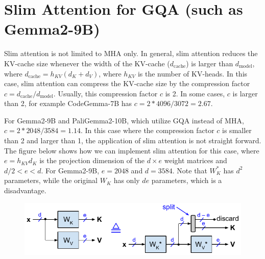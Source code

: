 \documentclass{article}
\begin{document}
\section{Slim Attention for GQA (such as Gemma2-9B)}
Slim attention is not limited to MHA only. In general, slim attention reduces the KV-cache size whenever the width of the KV-cache ($d_\text{cache}$) is larger than $d_\text{model}$, where $d_\text{cache} = h_{KV} (d_K + d_V)$, where $h_{KV}$ is the number of KV-heads. In this case, slim attention can compress the KV-cache size by the compression factor $c = d_\text{cache} / d_\text{model}$. Usually, this compression factor $c$ is 2. In some cases, $c$ is larger than 2, for example CodeGemma-7B has $c = 2*4096 / 3072 = 2.67$.

For Gemma2-9B and PaliGemma2-10B, which utilize GQA instead of MHA, $c = 2*2048/3584 = 1.14$. In this case where the compression factor $c$ is smaller than 2 and larger than 1, the application of slim attention is not straight forward. The figure below shows how we can implement slim attention for this case, where $e = h_{KV} d_K$ is the projection dimension of the $d \times e$ weight matrices and $d/2 < e < d$. For Gemma2-9B, $e = 2048$ and $d = 3584$. Note that $W_K^\ast$ has $d^2$ parameters, while the original $W_K$ has only $d e$ parameters, which is a disadvantage.
\begin{figure}[h!] \centering
  \includegraphics[scale=1.0]{../doc/fig/slimAttn_fig7.pdf}
\label{fig7} \end{figure}
\end{document}
